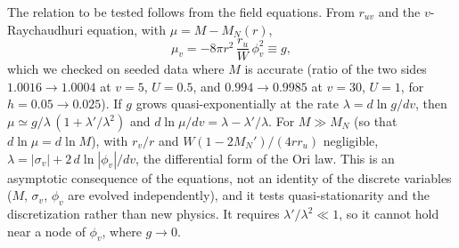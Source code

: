 \documentclass[11pt]{article}
\begin{document}
The relation to be tested follows from the field equations. From $r_{uv}$ and the $v$-Raychaudhuri equation, with $\mu=M-M_N(r)$,
\begin{equation}
\mu_v=-8\pi r^2\,\frac{r_u}{W}\,\phi_v^2\equiv g ,\label{eq:muv}
\end{equation}
which we checked on seeded data where $M$ is accurate (ratio of the two sides $1.0016\to1.0004$ at $v=5$, $U=0.5$, and $0.994\to0.9985$ at $v=30$, $U=1$, for $h=0.05\to0.025$). If $g$ grows quasi-exponentially at the rate $\lambda=d\ln g/dv$, then $\mu\simeq g/\lambda\,(1+\lambda'/\lambda^2)$ and $d\ln\mu/dv=\lambda-\lambda'/\lambda$. For $M\gg M_N$ (so that $d\ln\mu=d\ln M$), with $r_v/r$ and $W(1-2M_N')/(4rr_u)$ negligible, $\lambda=|\sigma_v|+2\,d\ln|\phi_v|/dv$, the differential form of the Ori law. This is an asymptotic consequence of the equations, not an identity of the discrete variables ($M$, $\sigma_v$, $\phi_v$ are evolved independently), and it tests quasi-stationarity and the discretization rather than new physics. It requires $\lambda'/\lambda^2\ll1$, so it cannot hold near a node of $\phi_v$, where $g\to0$.
\end{document}
